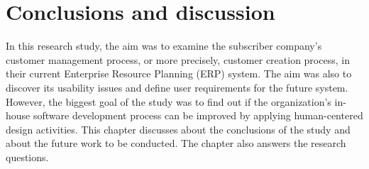 \documentclass[12pt,a4paper,oneside,pdftex]{report}
\begin{document}




% 


% 










% 

\chapter{Conclusions and discussion}
\label{chapter:conclusion}

In this research study, the aim was to examine the subscriber company's customer management process, or more precisely, customer creation process,  in their current Enterprise Resource Planning (ERP) system. The aim was also to discover its usability issues and define user requirements for the future system. However, the biggest goal of the study was to find out if the organization's in-house software development process can be improved by applying human-centered design activities. This chapter discusses about the conclusions of the study and about the future work to be conducted. The chapter also answers the research questions.
\end{document}

